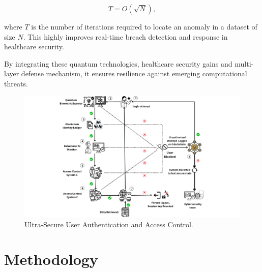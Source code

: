 \documentclass[pdflatex,sn-mathphys-num]{sn-jnl}
\theoremstyle{thmstyleone}%
\theoremstyle{thmstyletwo}%
\theoremstyle{thmstylethree}%
\begin{document}
\begin{equation}  
T = O(\sqrt{N}),  
\end{equation}  

where \( T \) is the number of iterations required to locate an anomaly in a dataset of size \( N \). This highly improves real-time breach detection and response in healthcare security.  

By integrating these quantum technologies, healthcare security gains and multi-layer defense mechanism, it ensures resilience against emerging computational threats.  


\begin{figure}[t]
\centering
\includegraphics[width=13cm]{User Authenticationing.png}
\centering
\caption{Ultra-Secure User Authentication and Access Control.}
  \label{fig:User_Authentication}
\end{figure}



\section{Methodology}

\end{document}
